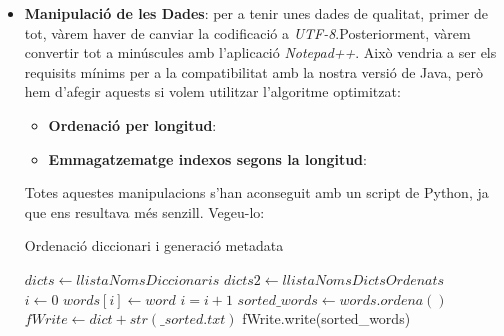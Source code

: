\documentclass[conference]{IEEEtran}
\begin{document}
        \begin{itemize}
            \item \textbf{Manipulació de les Dades}: per a tenir unes dades de qualitat, primer de tot, vàrem haver de canviar la codificació a \textit{UTF-8}.Posteriorment, vàrem convertir tot a minúscules amb l'aplicació \textit{Notepad++}. Això vendria a ser els requisits mínims per a la compatibilitat amb la nostra versió de Java, però hem d'afegir aquests si volem utilitzar l'algoritme optimitzat:

            \begin{itemize}
                \item \textbf{Ordenació per longitud}:

                \item \textbf{Emmagatzematge indexos segons la longitud}:
            \end{itemize}

            Totes aquestes manipulacions s'han aconseguit amb un script de Python, ja que ens resultava més senzill. Vegeu-lo:\\

                \begin{algorithm}
                    \caption{Ordenació diccionari i generació metadata}
                    \begin{algorithmic}[1]
                        \State $dicts  \gets llistaNomsDiccionaris$
                        \State $dicts2 \gets llistaNomsDictsOrdenats$\\

                                \State $i\gets 0$
                                    \State $words[i]\gets word$
                                    \State $i=i+1$
                                \EndFor
                                \State $sorted\_words \gets words.ordena()$
                                \State $fWrite \gets dict+str(\_sorted.txt)$
                                \State fWrite.write(sorted\_words)
                    \EndFor

                    \\\\


\end{algorithmic}
\end{algorithm}
\end{itemize}
\end{document}

